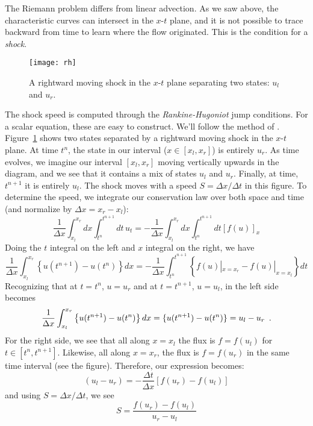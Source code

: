 The Riemann problem differs from linear advection.  As we saw above,
the characteristic curves can intersect in the $x$-$t$ plane, and it
is not possible to trace backward from time to learn where the flow
originated.  This is the condition for a {\em shock}.

\begin{figure}[t]
\centering
\texttt{[image: rh]}
\caption[Rankine-Hugoniot conditions]{\label{fig:rh} A rightward moving shock in the $x$-$t$
   plane separating two states: $u_l$ and $u_r$.}
\end{figure}

The shock speed is computed through the {\em Rankine-Hugoniot} jump
conditions.  For a scalar equation, these are easy to construct.
We'll follow the method of \cite{leveque:2002}.  Figure~\ref{fig:rh}
shows two states separated by a rightward moving shock in the $x$-$t$
plane.  At time $t^n$, the state in our interval ($x \in [x_l,x_r]$)
is entirely $u_r$.  As time evolves, we imagine our interval $[x_l,x_r]$ moving
vertically upwards in the diagram, and we see that it contains a mix of states $u_l$ and $u_r$.  Finally, at time, $t^{n+1}$ it is entirely
$u_l$.  The shock moves with a speed $S = \Delta x/\Delta t$ in this
figure.  To determine the speed, we integrate our conservation law over
both space and time (and normalize by $\Delta x = x_r - x_l$):
\begin{equation}
\frac{1}{\Delta x} \int_{x_l}^{x_r} dx \int_{t^n}^{t^{n+1}} dt\, u_t =
  - \frac{1}{\Delta x} \int_{x_l}^{x_r} dx \int_{t^n}^{t^{n+1}} dt \left [ f(u) \right ]_x
\end{equation}
Doing the $t$ integral on the left and $x$ integral on the right, we have
\begin{equation}
\frac{1}{\Delta x} \int_{x_l}^{x_r}\left \{ u(t^{n+1}) - u(t^n) \right \} dx =
  - \frac{1}{\Delta x} \int_{t^n}^{t^{n+1}} \left \{ f(u) |_{x=x_r} - f(u) |_{x=x_l} \right \} dt
\end{equation}
Recognizing that at $t=t^n$, $u = u_r$ and at $t=t^{n+1}$, $u = u_l$,
in the left side becomes
\begin{equation}
\frac{1}{\Delta x} \int_{x_l}^{x_r}\left \{ u(t^{n+1}) - u(t^n) \right \} dx = \{ u(t^{n+1}) - u(t^n) \} =  u_l -u_r \enskip .
\end{equation}
For the right side, we see that all along $x=x_l$ the flux is $f =
f(u_l)$ for $t\in [t^n, t^{n+1}]$.  Likewise, all along $x=x_r$, the
flux is $f = f(u_r)$ in the same time interval (see the figure).
Therefore, our expression becomes:
\begin{equation}
(u_l - u_r) = -\frac{\Delta t}{\Delta x} \left [ f(u_r) - f(u_l)\right ]
\end{equation}
and using $S = \Delta x/\Delta t$, we see
\begin{equation}
S = \frac{f(u_r) - f(u_l)}{u_r - u_l}
\end{equation}

